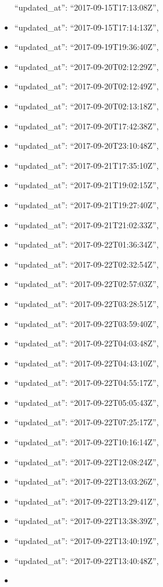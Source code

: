 \begin{itemize}
  ``updated\_at'': ``2017-09-15T17:13:08Z'',
\item
  ``updated\_at'': ``2017-09-15T17:14:13Z'',
\item
  ``updated\_at'': ``2017-09-19T19:36:40Z'',
\item
  ``updated\_at'': ``2017-09-20T02:12:29Z'',
\item
  ``updated\_at'': ``2017-09-20T02:12:49Z'',
\item
  ``updated\_at'': ``2017-09-20T02:13:18Z'',
\item
  ``updated\_at'': ``2017-09-20T17:42:38Z'',
\item
  ``updated\_at'': ``2017-09-20T23:10:48Z'',
\item
  ``updated\_at'': ``2017-09-21T17:35:10Z'',
\item
  ``updated\_at'': ``2017-09-21T19:02:15Z'',
\item
  ``updated\_at'': ``2017-09-21T19:27:40Z'',
\item
  ``updated\_at'': ``2017-09-21T21:02:33Z'',
\item
  ``updated\_at'': ``2017-09-22T01:36:34Z'',
\item
  ``updated\_at'': ``2017-09-22T02:32:54Z'',
\item
  ``updated\_at'': ``2017-09-22T02:57:03Z'',
\item
  ``updated\_at'': ``2017-09-22T03:28:51Z'',
\item
  ``updated\_at'': ``2017-09-22T03:59:40Z'',
\item
  ``updated\_at'': ``2017-09-22T04:03:48Z'',
\item
  ``updated\_at'': ``2017-09-22T04:43:10Z'',
\item
  ``updated\_at'': ``2017-09-22T04:55:17Z'',
\item
  ``updated\_at'': ``2017-09-22T05:05:43Z'',
\item
  ``updated\_at'': ``2017-09-22T07:25:17Z'',
\item
  ``updated\_at'': ``2017-09-22T10:16:14Z'',
\item
  ``updated\_at'': ``2017-09-22T12:08:24Z'',
\item
  ``updated\_at'': ``2017-09-22T13:03:26Z'',
\item
  ``updated\_at'': ``2017-09-22T13:29:41Z'',
\item
  ``updated\_at'': ``2017-09-22T13:38:39Z'',
\item
  ``updated\_at'': ``2017-09-22T13:40:19Z'',
\item
  ``updated\_at'': ``2017-09-22T13:40:48Z'',
\item

\end{itemize}

